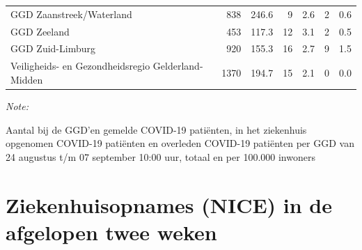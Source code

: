 \documentclass[
  english,
  man,floatsintext]{apa6}
\begin{document}
\begin{table}
\begin{threeparttable}
\begin{tabular}{lrrrrrr}
GGD Zaanstreek/Waterland & 838 & 246.6 & 9 & 2.6 & 2 & 0.6\\
GGD Zeeland & 453 & 117.3 & 12 & 3.1 & 2 & 0.5\\
GGD Zuid-Limburg & 920 & 155.3 & 16 & 2.7 & 9 & 1.5\\
Veiligheids- en Gezondheidsregio Gelderland-Midden & 1370 & 194.7 & 15 & 2.1 & 0 & 0.0\\
\bottomrule
\end{tabular}
\begin{tablenotes}
\item \textit{Note: } 
\item Aantal bij de GGD’en gemelde COVID-19 patiënten, in het ziekenhuis opgenomen COVID-19 patiënten en overleden COVID-19 patiënten per GGD van 24 augustus t/m 07 september 10:00 uur, totaal en per 100.000 inwoners
\end{tablenotes}
\end{threeparttable}
\endgroup{}
\end{table}

\newpage

\hypertarget{ziekenhuisopnames-nice-in-de-afgelopen-twee-weken}{%
\section{Ziekenhuisopnames (NICE) in de afgelopen twee weken}\label{ziekenhuisopnames-nice-in-de-afgelopen-twee-weken}}
\end{document}
